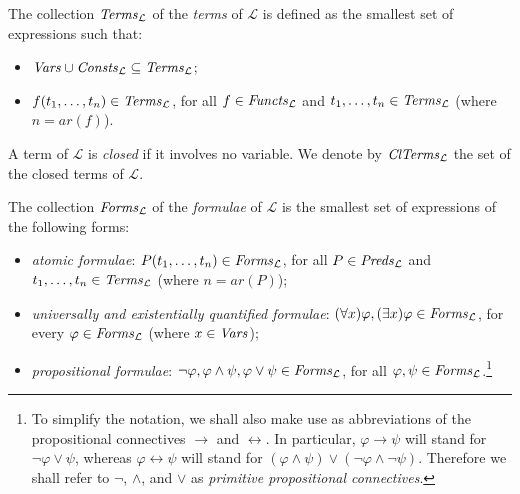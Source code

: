\documentclass[a4paper]{llncs}
\newcommand{\Lang}{\ensuremath{\mathcal{L}\xspace}} %
\newcommand{\LangPreds}{\Preds_{\Lang}}
\newcommand{\LangFuncts}{\Functs_{\Lang}}
\newcommand{\LangConsts}{\Consts_{\Lang}}
\newcommand{\LangTerms}{\Terms_{\Lang}}
\newcommand{\LangClTerms}{\ClTerms_{\Lang}}
\newcommand{\LangForms}{\Forms_{\Lang}}
\newcommand{\ar}{\mathit{ar}}
\newcommand{\nat}{\mathbb{N}}
\begin{document}
The collection $\LangTerms$ of the \emph{terms} of $\Lang$ is
defined as the smallest set of expressions such that:
\begin{itemize}
\item $\Vars \cup \LangConsts \subseteq \LangTerms$;

\item $f(t_1, \ldots, t_n) \in \LangTerms$, for all $f \in 
\LangFuncts$ and $t_1, \ldots, t_n \in \LangTerms$ (where $n = \ar(f)$).
\end{itemize}
A term of $\Lang$ is \emph{closed} if it involves no variable. We 
denote by $\LangClTerms$ the set of the closed terms of $\Lang$.

The collection $\LangForms$ of the \emph{formulae} of
$\Lang$ is the smallest set of expressions of the following forms:
\begin{itemize}
  \item \emph{atomic formulae}: $P(t_1, \ldots, t_n) \in \LangForms$, 
for all $P \in \LangPreds$ and $t_1, \ldots, t_n \in \LangTerms$ 
(where $n = \ar(P)$);
%

  \item \emph{universally and existentially quantified formulae}:
  $(\forall x)\varphi, (\exists x)\varphi \in \LangForms$, for every 
$\varphi \in \LangForms$ (where $x \in \mathit{Vars}$);

  \item \emph{propositional formulae}: $\neg \varphi, \varphi \wedge 
\psi,   \varphi \vee \psi \in \LangForms$, for all $\varphi, \psi \in 
\LangForms$.\footnote{To simplify the notation, we shall also make 
use as abbreviations of the propositional connectives $\rightarrow$ 
and $\leftrightarrow$. In particular, $\varphi \rightarrow \psi$ will 
stand for $\neg \varphi \vee \psi$, whereas $\varphi \leftrightarrow 
\psi$ will stand for $(\varphi \wedge \psi) \vee (\neg \varphi \wedge 
\neg\psi)$. Therefore we shall refer to $\neg$, $\wedge$, and $\vee$ 
as \emph{primitive propositional connectives}.}
%
\end{itemize}
\end{document}
